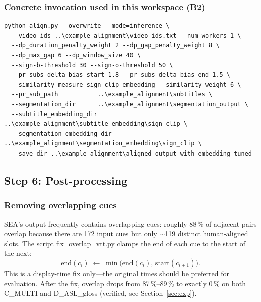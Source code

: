 \documentclass[11pt,a4paper]{article}
\def\texttt#1{#1}%
\begin{document}
\subsubsection{Concrete invocation used in this workspace (B2)}
\begin{lstlisting}
python align.py --overwrite --mode=inference \
  --video_ids ..\example_alignment\video_ids.txt --num_workers 1 \
  --dp_duration_penalty_weight 2 --dp_gap_penalty_weight 8 \
  --dp_max_gap 6 --dp_window_size 40 \
  --sign-b-threshold 30 --sign-o-threshold 50 \
  --pr_subs_delta_bias_start 1.8 --pr_subs_delta_bias_end 1.5 \
  --similarity_measure sign_clip_embedding --similarity_weight 6 \
  --pr_sub_path           ..\example_alignment\subtitles \
  --segmentation_dir      ..\example_alignment\segmentation_output \
  --subtitle_embedding_dir     ..\example_alignment\subtitle_embedding\sign_clip \
  --segmentation_embedding_dir ..\example_alignment\segmentation_embedding\sign_clip \
  --save_dir ..\example_alignment\aligned_output_with_embedding_tuned
\end{lstlisting}


\subsection{Step 6: Post-processing}
\label{sec:post}

\subsubsection{Removing overlapping cues}
SEA's output frequently contains overlapping cues: roughly 88\,\% of adjacent
pairs overlap because there are 172 input cues but only $\sim$119 distinct
human-aligned slots. The script \texttt{fix\_overlap\_vtt.py} clamps the end
of each cue to the start of the next:
\[
\mathrm{end}(c_i) \;\leftarrow\; \min\bigl(\mathrm{end}(c_i),\,
\mathrm{start}(c_{i+1})\bigr).
\]
This is a display-time fix only---the original times should be preferred for
evaluation. After the fix, overlap drops from 87\,\%--89\,\% to exactly
0\,\% on both \texttt{C\_MULTI} and \texttt{D\_ASL\_gloss} (verified, see
Section~\ref{sec:exp}).
\end{document}
